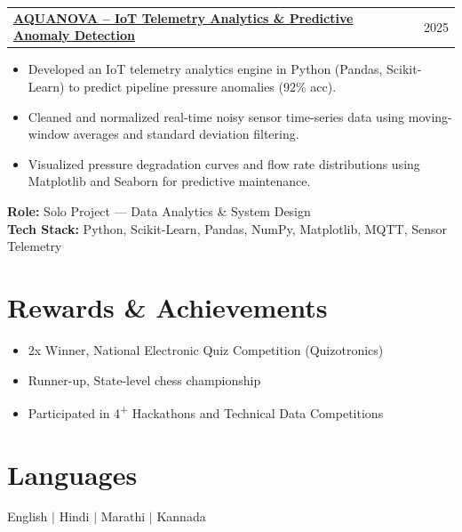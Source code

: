 \documentclass[letterpaper,10pt]{article}
\makeatletter
\newcommand{\resumeItemListStart}{\begin{itemize}[leftmargin=0.18in, topsep=1.5pt, parsep=0pt, itemsep=1pt]}
\newcommand{\resumeItemListEnd}{\end{itemize}\vspace{-4pt}}
\newcommand{\resumeItem}[1]{\item\small{#1}}
\newcommand{\resumeProjectHeading}[2]{
  \vspace{-1pt}
  \begin{tabular*}{\textwidth}[t]{l@{\extracolsep{\fill}}r}
    \textbf{#1} & #2 \\
  \end{tabular*}\vspace{-4pt}
}
\makeatother
\begin{document}
\vspace{3pt}

\resumeProjectHeading
  {\href{https://github.com/AdityaMittha/AQUANOVA}{\textbf{AQUANOVA -- IoT Telemetry Analytics \& Predictive Anomaly Detection}}}{2025}
\resumeItemListStart
  \resumeItem{Developed an IoT telemetry analytics engine in Python (Pandas, Scikit-Learn) to predict pipeline pressure anomalies (92\% acc).}
  \resumeItem{Cleaned and normalized real-time noisy sensor time-series data using moving-window averages and standard deviation filtering.}
  \resumeItem{Visualized pressure degradation curves and flow rate distributions using Matplotlib and Seaborn for predictive maintenance.}
\resumeItemListEnd
\small{\textbf{Role:} Solo Project --- Data Analytics \& System Design} \\
\small{\textbf{Tech Stack:} Python, Scikit-Learn, Pandas, NumPy, Matplotlib, MQTT, Sensor Telemetry}

\vspace{-2pt}

\section{Rewards \& Achievements}
\resumeItemListStart
  \resumeItem{2x Winner, National Electronic Quiz Competition (Quizotronics)}
  \resumeItem{Runner-up, State-level chess championship}
  \resumeItem{Participated in 4\textsuperscript{+} Hackathons and Technical Data Competitions}
\resumeItemListEnd

\vspace{-4pt}

\section{Languages}
\small
English \enspace $|$ \enspace Hindi \enspace $|$ \enspace Marathi \enspace $|$ \enspace Kannada
\end{document}
